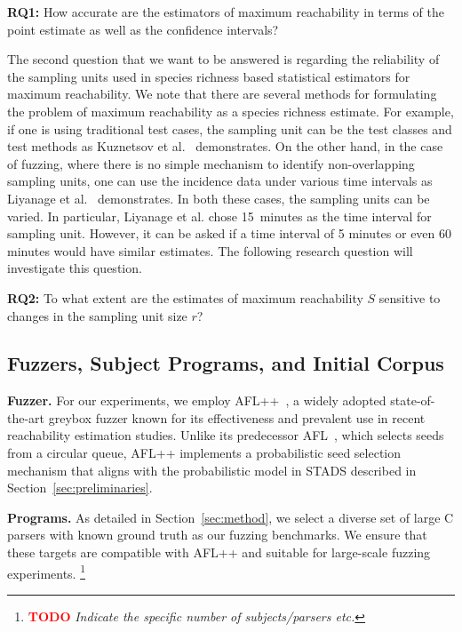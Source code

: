 \documentclass[conference,anonymous,review]{IEEEtran}
\newcounter{todocounter}
\newcommand{\todo}[1]{\marginpar{$|$}\textcolor{red}{\stepcounter{todocounter}\footnote[\thetodocounter]{\textcolor{red}{\textbf{TODO }}\textit{#1}}}}
\begin{document}
\noindent\textbf{RQ1:} How accurate are the estimators of maximum reachability
in terms of the point estimate as well as the confidence intervals?

The second question that we want to be answered is regarding the reliability
of the sampling units used in species richness based statistical estimators for
maximum reachability. We note that there are several methods for formulating
the problem of maximum reachability as a species richness estimate. For example,
if one is using traditional test cases, the sampling unit can be the test
classes and test methods as Kuznetsov et al.~\cite{Kuznetsov2024empirical}
demonstrates. On the other hand, in the case of fuzzing, where there is no
simple mechanism to identify non-overlapping sampling units, one can use the
incidence data under various time intervals as
Liyanage et al.~\cite{liyanage2023reachable} demonstrates. In both these cases, the
sampling units can be varied. In particular, Liyanage et al. chose 15~minutes
as the time interval for sampling unit. However, it can be asked if a time
interval of 5 minutes or even 60 minutes would have similar estimates.
The following research question will investigate this question.

\noindent\textbf{RQ2:} To what extent are the estimates of maximum reachability
$S$ sensitive to changes in the sampling unit size $r$?

\subsection{Fuzzers, Subject Programs, and Initial Corpus}

\noindent\textbf{Fuzzer.} For our experiments, we employ AFL++~\cite{fioraldi2020AFL++}, a widely adopted state-of-the-art greybox fuzzer known for its effectiveness and prevalent use in recent reachability estimation studies. Unlike its predecessor AFL~\cite{zalewski2017american}, which selects seeds from a circular queue, AFL++ implements a probabilistic seed selection mechanism that aligns with the probabilistic model in STADS described in Section~\ref{sec:preliminaries}. 
\vspace{1mm}

\noindent\textbf{Programs.} As detailed in Section~\ref{sec:method}, we select a diverse set of large C parsers with known ground truth as our fuzzing benchmarks. We ensure that these targets are compatible with AFL++ and suitable for large-scale fuzzing experiments. \todo{Indicate the specific number of subjects/parsers etc.}
\end{document}

